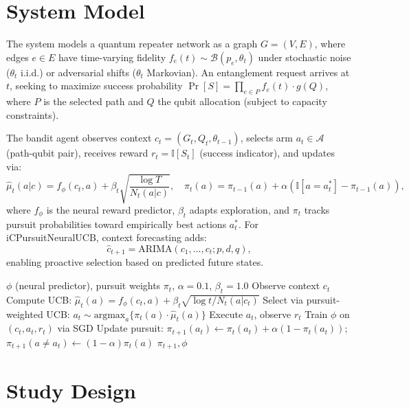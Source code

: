 \documentclass[sigconf,anonymous,review,natbib=false]{acmart}
\begin{document}
\section{System Model} 
\label{sec: SystemModel}

The system models a quantum repeater network as a graph $G=(V,E)$, where edges $e \in E$ have time-varying fidelity $f_e(t) \sim \mathcal{B}(p_e, \theta_t)$ under stochastic noise ($\theta_t$ i.i.d.) or adversarial shifts ($\theta_t$ Markovian). An entanglement request arrives at $t$, seeking to maximize success probability $\Pr[S] = \prod_{e \in P} f_e(t) \cdot g(Q)$, where $P$ is the selected path and $Q$ the qubit allocation (subject to capacity constraints).

The bandit agent observes context $c_t = (G_t, Q_t, \theta_{t-1})$, selects arm $a_t \in \mathcal{A}$ (path-qubit pair), receives reward $r_t = \mathbb{I}[S_t]$ (success indicator), and updates via:
\[
\hat{\mu}_t(a|c) = f_{\phi}(c_t, a) + \beta_t \sqrt{\frac{\log T}{N_t(a|c)}}, \quad \pi_t(a) = \pi_{t-1}(a) + \alpha (\mathbb{I}[a = a^*_t] - \pi_{t-1}(a)),
\]
where $f_{\phi}$ is the neural reward predictor, $\beta_t$ adapts exploration, and $\pi_t$ tracks pursuit probabilities toward empirically best actions $a^*_t$. For iCPursuitNeuralUCB, context forecasting adds:
\[
\hat{c}_{t+1} = \text{ARIMA}(c_1, \ldots, c_t; p,d,q),
\]
enabling proactive selection based on predicted future states.

\begin{algorithm}[t]
\caption{CPursuitNeuralUCB Update (Single Timestep)}
\label{alg:cpursuit}
\begin{algorithmic}[1]
\REQUIRE $\phi$ (neural predictor), pursuit weights $\pi_t$, $\alpha=0.1$, $\beta_t = 1.0$
\STATE Observe context $c_t$
\STATE Compute UCB: $\hat{\mu}_t(a) = f_{\phi}(c_t, a) + \beta_t \sqrt{\log t / N_t(a|c_t)}$
\STATE Select via pursuit-weighted UCB: $a_t \sim \text{argmax}_a \{\pi_t(a) \cdot \hat{\mu}_t(a)\}$
\STATE Execute $a_t$, observe $r_t$
\STATE Train $\phi$ on $(c_t, a_t, r_t)$ via SGD
\STATE Update pursuit: $\pi_{t+1}(a_t) \leftarrow \pi_t(a_t) + \alpha (1 - \pi_t(a_t))$; $\pi_{t+1}(a \ne a_t) \leftarrow (1-\alpha) \pi_t(a)$
\RETURN $\pi_{t+1}, \phi$
\end{algorithmic}
\end{algorithm}




\section{Study Design}
\label{sec:studydesign}
\end{document}
